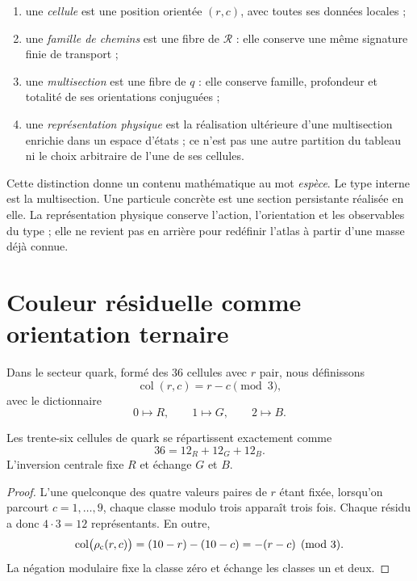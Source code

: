 \begin{enumerate}[label=(\roman*)]
 \item une \emph{cellule} est une position orientée \((r,c)\), avec toutes ses
 données locales ;
 \item une \emph{famille de chemins} est une fibre de \(\mathcal R\) : elle conserve
 une même signature finie de transport ;
 \item une \emph{multisection} est une fibre de \(q\) : elle conserve famille,
 profondeur et totalité de ses orientations conjuguées ;
 \item une \emph{représentation physique} est la réalisation ultérieure d'une
 multisection enrichie dans un espace d'états ; ce n'est pas une autre partition du
 tableau ni le choix arbitraire de l'une de ses cellules.
\end{enumerate}

Cette distinction donne un contenu mathématique au mot \emph{espèce}. Le type
interne est la multisection. Une particule concrète est une section
persistante réalisée en elle. La représentation physique conserve l'action,
l'orientation et les observables du type ; elle ne revient pas en arrière pour redéfinir
l'atlas à partir d'une masse déjà connue.

\section{Couleur résiduelle comme orientation ternaire}

Dans le secteur quark, formé des \(36\) cellules avec \(r\) pair, nous définissons
\[
 \operatorname{col}(r,c)=r-c\pmod3,
 \tag{A12}\label{eq:color-residual-atlas-rev6}
\]
avec le dictionnaire
\[
 0\longmapsto R,\qquad1\longmapsto G,\qquad2\longmapsto B.
\]

\begin{proposition}
\label{prop:color-atlas}
Les trente-six cellules de quark se répartissent exactement comme
\[
 36=12_R+12_G+12_B.
 \tag{A13}\label{eq:balance-color-atlas-rev6}
\]
L'inversion centrale fixe \(R\) et échange \(G\) et \(B\).
\end{proposition}

\begin{proof}
L'une quelconque des quatre valeurs paires de \(r\) étant fixée, lorsqu'on parcourt
\(c=1,\ldots,9\), chaque classe modulo trois apparaît trois fois. Chaque résidu
a donc \(4\cdot3=12\) représentants. En outre,
\[
 \operatorname{col}\bigl(\rho_{\rm c}(r,c)\bigr)
 =(10-r)-(10-c)
 =-(r-c)\pmod3.
\]
La négation modulaire fixe la classe zéro et échange les classes un et deux.
\end{proof}


